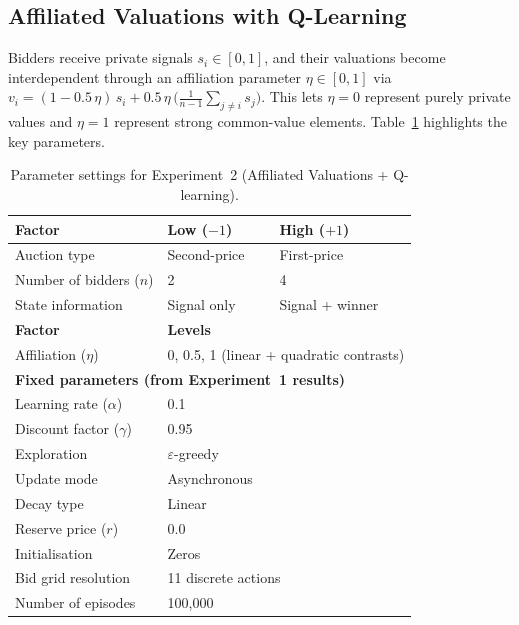\subsection{Affiliated Valuations with Q-Learning}

Bidders receive private signals $s_i\in[0,1]$, and their valuations become interdependent through an affiliation parameter $\eta\in[0,1]$ via $v_i=(1-0.5\,\eta)\,s_i + 0.5\,\eta\,\bigl(\tfrac{1}{n-1}\sum_{j\neq i}s_j\bigr)$. This lets $\eta=0$ represent purely private values and $\eta=1$ represent strong common-value elements. Table~\ref{tab:exp2params} highlights the key parameters.

\begin{table}[h]
\centering
\caption{Parameter settings for Experiment~2 (Affiliated Valuations + Q-learning).}
\label{tab:exp2params}
\begin{tabular}{l l l}
\toprule
\textbf{Factor} & \textbf{Low ($-1$)} & \textbf{High ($+1$)}\\
\midrule
Auction type & Second-price & First-price \\
Number of bidders ($n$) & 2 & 4 \\
State information & Signal only & Signal + winner \\
\midrule
\textbf{Factor} & \multicolumn{2}{l}{\textbf{Levels}} \\
\midrule
Affiliation ($\eta$) & \multicolumn{2}{l}{0, 0.5, 1 (linear + quadratic contrasts)} \\
\midrule
\multicolumn{3}{l}{\textbf{Fixed parameters (from Experiment~1 results)}} \\
\midrule
Learning rate ($\alpha$) & \multicolumn{2}{l}{0.1} \\
Discount factor ($\gamma$) & \multicolumn{2}{l}{0.95} \\
Exploration & \multicolumn{2}{l}{$\varepsilon$-greedy} \\
Update mode & \multicolumn{2}{l}{Asynchronous} \\
Decay type & \multicolumn{2}{l}{Linear} \\
Reserve price ($r$) & \multicolumn{2}{l}{0.0} \\
Initialisation & \multicolumn{2}{l}{Zeros} \\
Bid grid resolution & \multicolumn{2}{l}{11 discrete actions} \\
Number of episodes & \multicolumn{2}{l}{100{,}000} \\
\bottomrule
\end{tabular}
\end{table}

